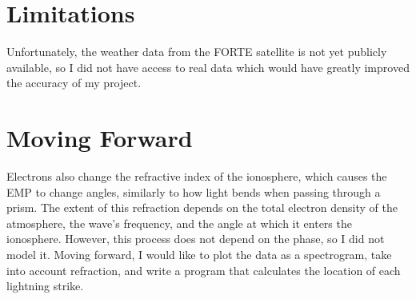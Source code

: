 \documentclass[12pt, reqno]{amsart}
\begin{document}
\section{Limitations}

\noindent Unfortunately, the weather data from the FORTE satellite is not yet publicly available, so I did not have access to real data which would have greatly improved the accuracy of my project.


\section{Moving Forward}

\noindent Electrons also change the refractive index of the ionosphere, which causes the EMP to change angles, similarly to how light bends when passing through a prism. The extent of this refraction depends on the total electron density of the atmosphere, the wave's frequency, and the angle at which it enters the ionosphere. However, this process does not depend on the phase, so I did not model it.  Moving forward, I would like to plot the data as a spectrogram, take into account refraction, and write a program that calculates the location of each lightning strike.
\\
\\
\cite{ionosphericdelay} 
\cite{forte}
\cite{edfenimore}
\medskip
\printbibliography
\end{document}
